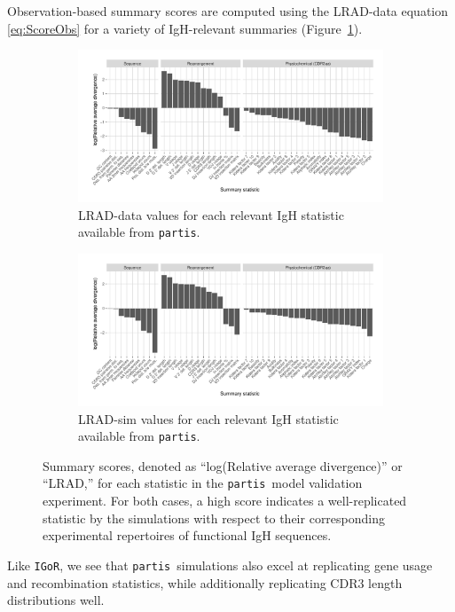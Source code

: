 \documentclass{article}
\newcommand{\partis}{\texttt{partis}}
\newcommand{\igor}{\texttt{IGoR}}
\begin{document}
Observation-based summary scores are computed using the LRAD-data equation \eqref{eq:ScoreObs} for a variety of IgH-relevant summaries (Figure~\ref{fig:ObsScoresBCR}). 
\begin{figure}
	\begin{subfigure}{\textwidth}
    	\includegraphics[width=\linewidth]{Figures/PartisScores/obs_score_plot.pdf}
    	\caption{LRAD-data values for each relevant IgH statistic available from \partis.}
    	\label{fig:ObsScoresBCR}
	\end{subfigure}
	\begin{subfigure}{\textwidth}
    	\includegraphics[width=\linewidth]{Figures/PartisScores/sim_score_plot.pdf}
    	\caption{LRAD-sim values for each relevant IgH statistic available from \partis.}
    	\label{fig:SimScoresBCR}
	\end{subfigure}
	\caption{Summary scores, denoted as ``log(Relative average divergence)'' or ``LRAD,'' for each statistic in the \partis\ model validation experiment. For both cases, a high score indicates a well-replicated statistic by the simulations with respect to their corresponding experimental repertoires of functional IgH sequences.}
	\label{fig:BCRScores}
\end{figure}
Like \igor, we see that \partis\ simulations also excel at replicating gene usage and recombination statistics, while additionally replicating CDR3 length distributions well.
\end{document}

